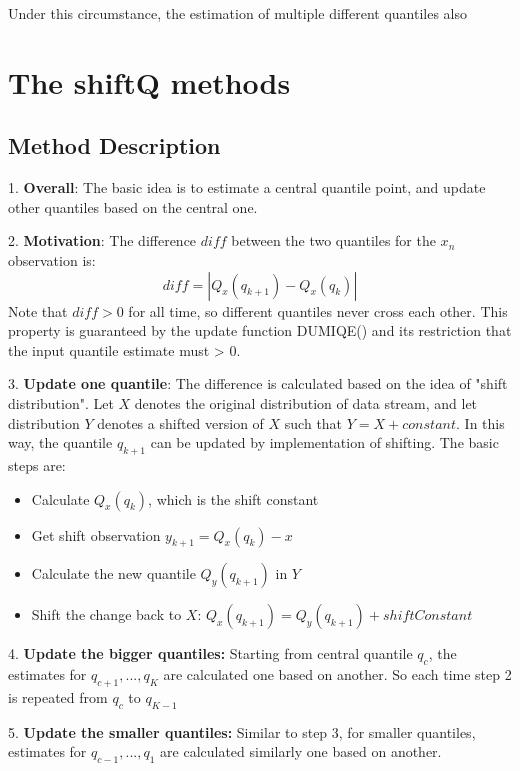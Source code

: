 Under this circumstance, the estimation of multiple different quantiles also 

\iffalse

\section{The shiftQ methods}
\label{sec: multi_shiftQ}

\subsection{Method Description}

1. \textbf{Overall}: The basic idea is to estimate a central quantile point, and update other quantiles based on the central one. 

2. \textbf{Motivation}: The difference $diff$ between the two quantiles for the $x_{n}$ observation is:
$$
diff = |Q_x(q_{k+1}) - Q_x(q_k)|
$$
    Note that $diff > 0$ for all time, so different quantiles never cross each other. This property is guaranteed by the update function DUMIQE() and its restriction that the input quantile estimate must > 0.

3. \textbf{Update one quantile}: The difference is calculated based on the idea of "shift distribution". Let $X$ denotes the original distribution of data stream, and let distribution $Y$ denotes a shifted version of $X$ such that $Y = X + constant$. In this way, the quantile $q_{k+1}$ can be updated by implementation of shifting. The basic steps are:
\begin{itemize}
    \item Calculate $Q_x(q_k)$, which is the shift constant
    \item Get shift observation $y_{k+1} =  Q_x(q_k) - x$
    \item Calculate the new quantile $Q_y(q_{k+1})$ in $Y$
    \item Shift the change back to $X$: $Q_x(q_{k+1}) = Q_y(q_{k+1}) + shiftConstant$
\end{itemize}

4. \textbf{Update the bigger quantiles:} Starting from central quantile $q_c$, the estimates for $q_{c+1}, ..., q_{K}$ are calculated one based on another. So each time step 2 is repeated from $q_c$ to $q_{K-1}$

5. \textbf{Update the smaller quantiles:} Similar to step 3, for smaller quantiles, estimates for $q_{c-1}, ..., q_{1}$ are calculated similarly one based on another.

